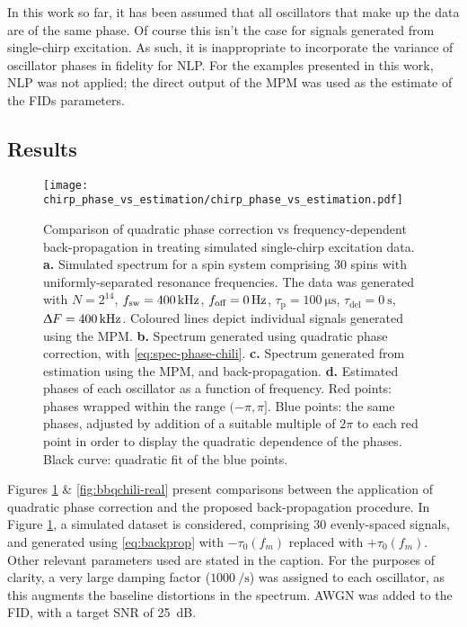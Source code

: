 In this work so far, it has been assumed that all oscillators that make up the
data are of the same phase. Of course this isn't the case for signals
generated from single-chirp excitation. As such, it is inappropriate to
incorporate the variance of oscillator phases in fidelity for \ac{NLP}.
For the examples presented in this work, \ac{NLP} was not applied; the direct
output of the \ac{MPM} was used as the estimate of the \acp{FID} parameters.

\subsection{Results}
\begin{figure}
    \centering
    \texttt{[image: chirp\_phase\_vs\_estimation/chirp\_phase\_vs\_estimation.pdf]}
    \caption[
        Comparison of quadratic phase correction vs frequency-dependent
        back-propagation in treating simulated single-chirp excitation data.
    ]
    {
        Comparison of quadratic phase correction vs frequency-dependent
        back-propagation in treating simulated single-chirp excitation data.
        \textbf{a.} Simulated spectrum for a spin system comprising 30 spins
        with uniformly-separated resonance frequencies. The data was generated
        with
        $N=2^{14}$,
        $f_{\mathrm{sw}}=\qty{400}{\kilo\hertz}$,
        $f_{\text{off}}=\qty{0}{\hertz}$,
        $\tau_{\text{p}} = \qty{100}{\micro\second}$,
        $\tau_{\text{del}} = \qty{0}{\second}$,
        $\Updelta F = \qty{400}{\kilo\hertz}$.
        Coloured lines depict individual signals generated using the \ac{MPM}.
        \textbf{b.} Spectrum generated using quadratic phase correction, with
        \eqref{eq:spec-phase-chili}.
        \textbf{c.} Spectrum generated from estimation using the \ac{MPM}, and
        back-propagation.
        \textbf{d.} Estimated phases of each oscillator as a function of
        frequency. Red points: phases wrapped within the range $(-\pi, \pi]$.
        Blue points: the same phases, adjusted by addition of a suitable multiple
        of $2 \pi$ to each red point in order to display the quadratic
        dependence of the phases. Black curve: quadratic fit of the blue
        points.
    }
    \label{fig:bbqchili-sim}
\end{figure}
Figures \ref{fig:bbqchili-sim} \& \ref{fig:bbqchili-real} present comparisons
between the application of quadratic phase correction and the proposed
back-propagation procedure. In Figure \ref{fig:bbqchili-sim}, a simulated
dataset is considered, comprising 30 evenly-spaced signals, and generated using
\eqref{eq:backprop} with $-\tau_0(f_m)$ replaced with $+\tau_0(f_m)$. Other
relevant parameters used are stated in the caption.
For the purposes of clarity, a very large damping factor
($\qty{1000}{\per\second}$) was assigned to each oscillator, as this augments
the baseline distortions in the spectrum. \ac{AWGN} was added to the \ac{FID},
with a target \ac{SNR} of \qty{25}{\deci\bel}.

